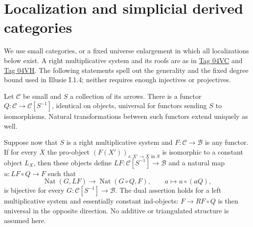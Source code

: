 
\section{Localization and simplicial derived categories}
\label{section-illusie-I-localization}

\noindent
We use small categories, or a fixed universe enlargement in which all
localizations below exist. A right multiplicative system and its roofs
are as in \href{https://stacks.math.columbia.edu/tag/04VC}{Tag 04VC} and
\href{https://stacks.math.columbia.edu/tag/04VH}{Tag 04VH}.
The following statements spell out the generality and the fixed degree bound
used in Illusie I.1.4; neither requires enough injectives or projectives.

\begin{lemma}
\label{lemma-illusie-I-localization-derived}
Let $\mathcal C$ be small and $S$ a collection of its arrows. There is a
functor $Q:\mathcal C\to\mathcal C[S^{-1}]$, identical on objects,
universal for functors sending $S$ to isomorphisms. Natural transformations
between such functors extend uniquely as well.

Suppose now that $S$ is a right multiplicative system and
$F:\mathcal C\to\mathcal B$ is any functor. If for every $X$ the pro-object
$(F(X'))_{s:X'\to X\text{ in }S}$ is isomorphic to a constant object
$L_X$, then these objects define $LF:\mathcal C[S^{-1}]\to\mathcal B$
and a natural map $u:LF\circ Q\to F$ such that
\[
 \operatorname{Nat}(G,LF)\longrightarrow
 \operatorname{Nat}(G\circ Q,F),\qquad a\longmapsto u\circ(aQ),
\]
is bijective for every $G:\mathcal C[S^{-1}]\to\mathcal B$.
The dual assertion holds for a left multiplicative system and essentially
constant ind-objects: $F\to RF\circ Q$ is then universal in the opposite
direction. No additive or triangulated structure is assumed here.
\end{lemma}


